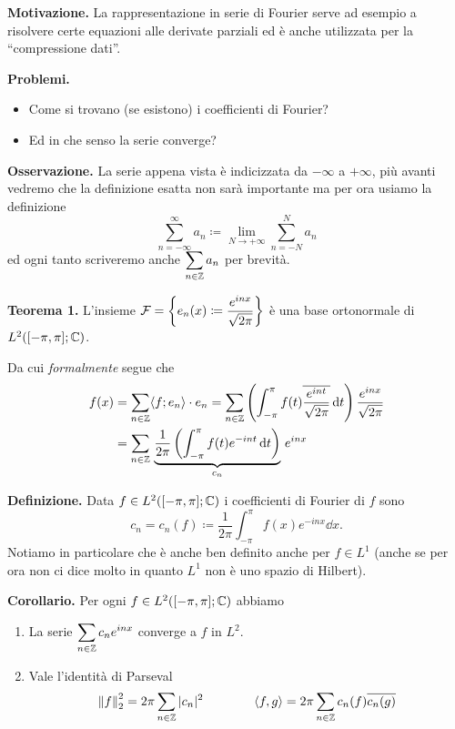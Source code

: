 \textbf{Motivazione.}
La rappresentazione in serie di Fourier serve ad esempio a risolvere certe equazioni alle derivate parziali ed è anche utilizzata per la ``compressione dati''.

\textbf{Problemi.}
\begin{itemize}
	\item Come si trovano (se esistono) i coefficienti di Fourier?
	\item Ed in che senso la serie converge?
\end{itemize}

\textbf{Osservazione.}
La serie appena vista è indicizzata da $-\infty$ a $+\infty$, più avanti vedremo che la definizione esatta non sarà importante ma per ora usiamo la definizione
$$
\sum_{n=-\infty}^\infty a_n \coloneqq \lim_{N \to +\infty} \sum_{n = -N}^N a_n
$$
ed ogni tanto scriveremo anche $\displaystyle \sum_{n \in \mathbb Z} a_n$ per brevità.

\textbf{Teorema 1.}
L'insieme $\displaystyle\mathcal F = \left\{ e_n(x) \coloneqq \frac{e^{inx}}{\sqrt{2\pi}} \right\}$ è una base ortonormale di $L^2([-\pi, \pi]; \mathbb C)$.

Da cui \textit{formalmente} segue che
$$
\begin{aligned}
	f(x) 
	&= \sum_{n \in \mathbb Z} \langle f; e_n \rangle \cdot e_n
	= \sum_{n \in \mathbb Z} \left( \int_{-\pi}^\pi f(t) \overline{\frac{e^{int}}{\sqrt{2\pi}}} \,\mathrm{d} t \right) \frac{e^{inx}}{\sqrt{2\pi}} \\
	&= \sum_{n \in \mathbb Z} \, \underbrace{\frac{1}{2\pi} \left( \int_{-\pi}^\pi f(t) e^{-int} \,\mathrm{d} t \right)}_{c_n} \, e^{inx}
\end{aligned}
$$

\textbf{Definizione.}
Data $f \in L^2([-\pi, \pi]; \mathbb C)$ i coefficienti di Fourier di $f$ sono
$$
	c_n = c_n(f) \coloneqq \frac{1}{2\pi} \int_{-\pi}^\pi f(x) e^{-inx} \dd x.
$$
Notiamo in particolare che è anche ben definito anche per $f \in L^1$ (anche se per ora non ci dice molto in quanto $L^1$ non è uno spazio di Hilbert).

\textbf{Corollario.}
Per ogni $f \in L^2([-\pi, \pi]; \mathbb C)$ abbiamo
\begin{enumerate}
	\item \label{item:4nov2021_cor1_1} 
		La serie $\displaystyle \sum_{n \in \mathbb Z} c_n e^{inx}$ converge a $f$ in $L^2$.

	\item Vale l'identità di Parseval
		$$
		\left\lVert f \right\rVert_2^2 = 2 \pi \sum_{n \in \mathbb Z} |c_n|^2
		\qquad
		\qquad
		\langle f, g \rangle = 2\pi \sum_{n \in \mathbb Z} c_n(f) \overline{c_n(g)}
		$$
\end{enumerate}

